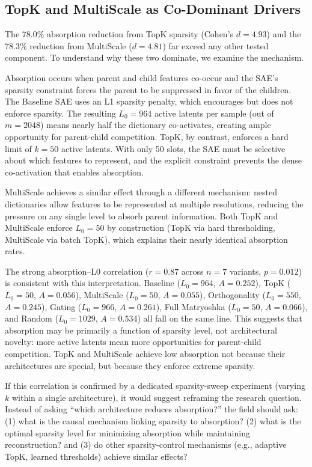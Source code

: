 \documentclass{article}
\begin{document}
\subsection{TopK and MultiScale as Co-Dominant Drivers}

The 78.0\% absorption reduction from TopK sparsity (Cohen's $d = 4.93$) and the 78.3\% reduction from MultiScale ($d = 4.81$) far exceed any other tested component. To understand why these two dominate, we examine the mechanism.

Absorption occurs when parent and child features co-occur and the SAE's sparsity constraint forces the parent to be suppressed in favor of the children. The Baseline SAE uses an L1 sparsity penalty, which encourages but does not enforce sparsity. The resulting $L_0 = 964$ active latents per sample (out of $m = 2048$) means nearly half the dictionary co-activates, creating ample opportunity for parent-child competition. TopK, by contrast, enforces a hard limit of $k = 50$ active latents. With only 50 slots, the SAE must be selective about which features to represent, and the explicit constraint prevents the dense co-activation that enables absorption.

MultiScale achieves a similar effect through a different mechanism: nested dictionaries allow features to be represented at multiple resolutions, reducing the pressure on any single level to absorb parent information. Both TopK and MultiScale enforce $L_0 = 50$ by construction (TopK via hard thresholding, MultiScale via batch TopK), which explains their nearly identical absorption rates.

The strong absorption--L0 correlation ($r = 0.87$ across $n = 7$ variants, $p = 0.012$) is consistent with this interpretation. Baseline ($L_0 = 964$, $A = 0.252$), TopK ($L_0 = 50$, $A = 0.056$), MultiScale ($L_0 = 50$, $A = 0.055$), Orthogonality ($L_0 = 550$, $A = 0.245$), Gating ($L_0 = 966$, $A = 0.261$), Full Matryoshka ($L_0 = 50$, $A = 0.066$), and Random ($L_0 = 1029$, $A = 0.534$) all fall on the same line. This suggests that absorption may be primarily a function of sparsity level, not architectural novelty: more active latents mean more opportunities for parent-child competition. TopK and MultiScale achieve low absorption not because their architectures are special, but because they enforce extreme sparsity.

If this correlation is confirmed by a dedicated sparsity-sweep experiment (varying $k$ within a single architecture), it would suggest reframing the research question. Instead of asking ``which architecture reduces absorption?'' the field should ask: (1) what is the causal mechanism linking sparsity to absorption? (2) what is the optimal sparsity level for minimizing absorption while maintaining reconstruction? and (3) do other sparsity-control mechanisms (e.g., adaptive TopK, learned thresholds) achieve similar effects?
\end{document}

